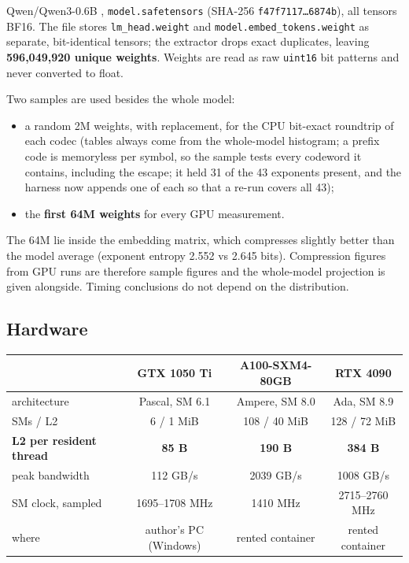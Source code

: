 \documentclass[11pt,a4paper]{article}
\newcommand{\code}[1]{\texttt{#1}}
\newcommand{\B}[1]{\textbf{#1}}
\begin{document}
Qwen/Qwen3-0.6B \cite{qwen}, \code{model.safetensors} (SHA-256 \code{f47f7117\ldots6874b}), all tensors BF16. The file stores \code{lm\_head.weight} and \code{model.embed\_tokens.weight} as separate, bit-identical tensors; the extractor drops exact duplicates, leaving \B{596,049,920 unique weights}. Weights are read as raw \code{uint16} bit patterns and never converted to float.

Two samples are used besides the whole model:
\begin{itemize}
\item a random 2M weights, with replacement, for the CPU bit-exact roundtrip of each codec (tables always come from the whole-model histogram; a prefix code is memoryless per symbol, so the sample tests every codeword it contains, including the escape; it held 31 of the 43 exponents present, and the harness now appends one of each so that a re-run covers all 43);
\item the \B{first 64M weights} for every GPU measurement.
\end{itemize}

The 64M lie inside the embedding matrix, which compresses slightly better than the model average (exponent entropy 2.552 vs 2.645 bits). Compression figures from GPU runs are therefore sample figures and the whole-model projection is given alongside. Timing conclusions do not depend on the distribution.

\subsection{Hardware}

\begin{center}
\begin{tabular}{@{}lccc@{}}
\toprule
 & GTX 1050 Ti & A100-SXM4-80GB & RTX 4090 \\
\midrule
architecture & Pascal, SM 6.1 & Ampere, SM 8.0 & Ada, SM 8.9 \\
SMs / L2 & 6 / 1 MiB & 108 / 40 MiB & 128 / 72 MiB \\
\B{L2 per resident thread} & \B{85 B} & \B{190 B} & \B{384 B} \\
peak bandwidth & 112 GB/s & 2039 GB/s & 1008 GB/s \\
SM clock, sampled & 1695--1708 MHz & 1410 MHz & 2715--2760 MHz \\
where & author's PC (Windows) & rented container & rented container \\
\bottomrule
\end{tabular}
\end{center}
\end{document}
